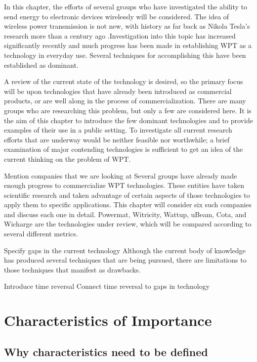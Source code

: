 In this chapter, the efforts of several groups who have investigated the ability to send energy to electronic devices wirelessly will be considered. The idea of wireless power transmission is not new, with history as far back as Nikola Tesla’s research more than a century ago \cite{nikolatesla1914}.Investigation into this topic has increased significantly recently and much progress has been made in establishing WPT as a technology in everyday use. Several techniques for accomplishing this have been established as dominant.

A review of the current state of the technology is desired, so the primary focus will be upon technologies that have already been introduced as commercial products, or are well along in the process of commercialization. There are many groups who are researching this problem, but only a few are considered here. It is the aim of this chapter to introduce the few dominant technologies and to provide examples of their use in a public setting. To investigate all current research efforts that are underway would be neither feasible nor worthwhile; a brief examination of major contending technologies is sufficient to get an idea of the current thinking on the problem of WPT.

Mention companies that we are looking at
Several groups have already made enough progress to commercialize WPT technologies. These entities have taken scientific research and taken advantage of certain aspects of those technologies to apply them to specific applications. This chapter will consider six such companies and discuss each one in detail. Powermat, Witricity, Wattup, uBeam, Cota, and Wicharge are the technologies under review, which will be compared according to several different metrics.

Specify gaps in the current technology
Although the current body of knowledge has produced several techniques that are being pursued, there are limitations to those techniques that manifest as drawbacks.

Introduce time reversal
Connect time reversal to gaps in technology

\section{Characteristics of Importance}
\label{sec:lit-review-chars}

\subsection{Why characteristics need to be defined}

